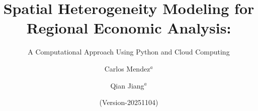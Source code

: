 \documentclass[smallextended, natbib]{svjour3}       %
\begin{document}
\title{Spatial Heterogeneity Modeling for Regional Economic Analysis: 
}
\subtitle{A Computational Approach Using Python and Cloud Computing}



\author{Carlos Mendez$^a$ \and Qian Jiang$^a$
}

\providecommand{\JELkeywords}[1]{\textbf{JEL Classifications} #1}




\date{(Version-20251104)}


\maketitle
\end{document}
